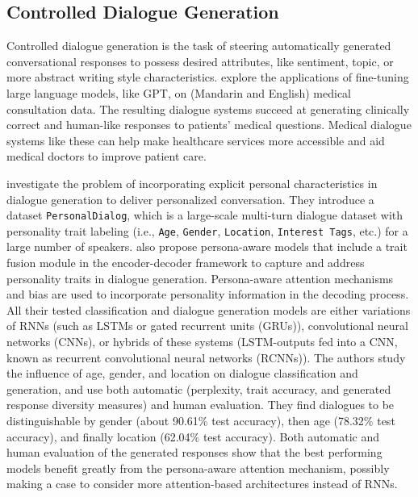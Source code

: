 \subsection{Controlled Dialogue Generation}
Controlled dialogue generation is the task of steering automatically generated conversational responses to possess desired attributes, like sentiment, topic, or more abstract writing style characteristics.
\cite{zeng-etal-2020-meddialog} explore the applications of fine-tuning large language models, like GPT, on (Mandarin and English) medical consultation data. The resulting dialogue systems succeed at generating clinically correct and human-like responses to patients' medical questions. Medical dialogue systems like these can help make healthcare services more accessible and aid medical doctors to improve patient care.

\cite{zheng2019personalized} investigate the problem of incorporating explicit personal characteristics in dialogue generation to deliver personalized conversation. They introduce a dataset \texttt{PersonalDialog}, which is a large-scale multi-turn dialogue dataset with personality trait labeling (i.e., \texttt{Age}, \texttt{Gender}, \texttt{Location}, \texttt{Interest Tags}, etc.) for a large number of speakers. \cite{zheng2019personalized} also propose persona-aware models that include a trait fusion module in the encoder-decoder framework to capture and address personality traits in dialogue generation. Persona-aware attention mechanisms and bias are used to incorporate personality information in the decoding process. All their tested classification and dialogue generation models are either variations of RNNs (such as LSTMs or gated recurrent units (GRUs)), convolutional neural networks (CNNs), or hybrids of these systems (LSTM-outputs fed into a CNN, known as recurrent convolutional neural networks (RCNNs)). The authors study the influence of age, gender, and location on dialogue classification and generation, and use both automatic (perplexity, trait accuracy, and generated response diversity measures) and human evaluation. They find dialogues to be distinguishable by gender (about 90.61\% test accuracy), then age (78.32\% test accuracy), and finally location (62.04\% test accuracy). Both automatic and human evaluation of the generated responses show that the best performing models benefit greatly from the persona-aware attention mechanism, possibly making a case to consider more attention-based architectures instead of RNNs.

